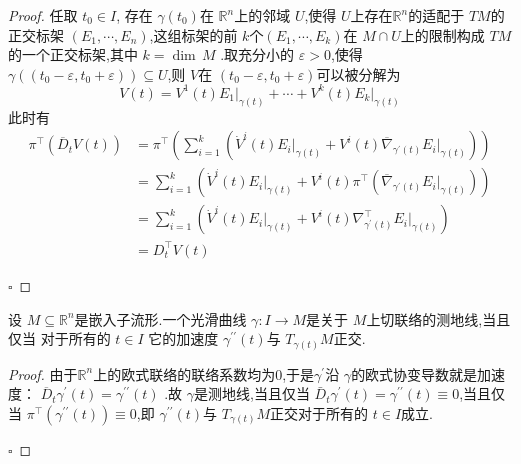 \documentclass[../../几何与拓扑.tex]{subfiles}
\begin{document}
\begin{proof}
    任取 \(  t_0 \in I  \), 存在 \(   \gamma \left( t_0 \right)   \)在 \(  \mathbb{R} ^{n}  \)上的邻域 \(  U  \),使得 \(  U  \)上存在\(  \mathbb{R} ^{n}  \)的适配于 \(  TM  \)的正交标架 \(  \left(  E_1,\cdots,E_n  \right)   \),这组标架的前 \(  k  \)个\(  \left(  E_1,\cdots,E_k  \right)   \)在 \(  M\cap U  \)上的限制构成 \(  TM  \)的一个正交标架,其中 \(  k =  \operatorname{dim}\,M  \)  .取充分小的 \(   \varepsilon >0  \),使得 \(   \gamma \left( \left( t_0- \varepsilon ,t_0+  \varepsilon  \right)  \right)\subseteq U   \),则 \(  V  \)在 \(  \left( t_0- \varepsilon ,t_0+  \varepsilon  \right)   \)可以被分解为 \[
   V\left( t \right)= V^{1}\left( t \right) \left. E_{1} \right|_{ \gamma \left( t \right) }  + \cdots + V^{k}\left( t \right) \left. E_{k} \right|_{ \gamma \left( t \right) }
    \]此时有 \[
    \begin{aligned}
    \pi ^{\top}\left( \overline{D}_{t}V\left( t \right)  \right)& = \pi ^{\top}\left( \sum _{i= 1}^{k}\left( \dot{V}^{i}\left( t \right) \left. E_{i} \right|_{ \gamma \left( t \right) }+ V^{i}\left( t \right)  \overline{ \nabla }_{ \gamma ^{\prime} \left( t \right) } \left. E_{i} \right|_{ \gamma \left( t \right) }   \right)  \right) \\ 
     & =  \sum _{i= 1}^{k}\left( \dot{V}^{i}\left( t \right) \left. E_{i} \right|_{ \gamma \left( t \right) }+ V^{i}\left( t \right) \pi ^{\top} \left( \overline{ \nabla }_{ \gamma ^{\prime} \left( t \right) }\left. E_{i} \right|_{ \gamma \left( t \right) } \right)    \right)\\ 
      & = \sum _{i= 1}^{k}\left( \dot{V}^{i}\left( t \right)\left. E_{i} \right|_{ \gamma \left( t \right) }+ V^{i}\left( t \right)  \nabla ^{\top}_{ \gamma ^{\prime} \left( t \right) }\left. E_{i} \right|_{ \gamma \left( t \right) }   \right)\\ 
       & =  D_{t}^{\top}V\left( t \right)   
    \end{aligned}
    \]          

    \hfill $\square$
\end{proof}

\begin{corollary}
    设 \(  M\subseteq \mathbb{R} ^{n}  \)是嵌入子流形.一个光滑曲线 \(   \gamma : I\to M  \)是关于 \(  M  \)上切联络的测地线,当且仅当 对于所有的 \(  t \in I  \) 它的加速度 \(   \gamma ^{\prime \prime} \left( t \right)   \)与 \(  T_{ \gamma \left( t \right) }M  \)正交.     
\end{corollary}
\begin{proof}
    由于\(  \mathbb{R} ^{n}  \)上的欧式联络的联络系数均为0,于是\(   \gamma ^{\prime}   \)沿 \(   \gamma   \)的欧式协变导数就是加速度： \(  \overline{D}_{t} \gamma ^{\prime} \left( t \right)=  \gamma ^{\prime \prime} \left( t \right)    \)    .故 \(   \gamma   \)是测地线,当且仅当 \(  \bar{D}_{t} \gamma ^{\prime} \left( t \right)=  \gamma ^{\prime \prime} \left( t \right)\equiv 0    \),当且仅当 \(  \pi ^{\top}  \left(  \gamma ^{\prime \prime} \left( t \right)  \right)\equiv 0 \),即 \(   \gamma ^{\prime \prime} \left( t \right)   \)与 \(  T_{ \gamma \left( t \right) }M  \)正交对于所有的 \(  t\in I  \)成立.    

    \hfill $\square$
\end{proof}
\end{document}
